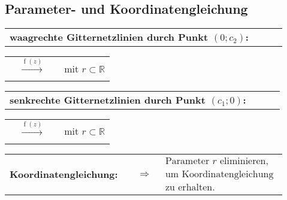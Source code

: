 \subsection{Parameter- und Koordinatengleichung}
	\begin{minipage}[t]{0.2\textwidth}
		
	\end{minipage}
	\begin{minipage}[t]{0.8\textwidth}
		\begin{tabular}{llll}
			\textbf{waagrechte Gitternetzlinien durch Punkt $(0; c_2)$:} & &\\[3pt]
		\end{tabular}
		\begin{tabular}{llll}
			\fbox{$z = \operatorname{z}\left( r \right) = r + \mathrm{j} c_2$} & $\xrightarrow[]{\operatorname{f}\left( z \right)}$ & \fbox{$w = \operatorname{w}\left( r \right) = \operatorname{f}\left( \operatorname{z}\left( r \right) \right) = \operatorname{f}\left( r + \mathrm{j} c_2 \right)$} & mit $r \subset \mathbb{R}$\\[3pt]
		\end{tabular}
		\begin{tabular}{llll}
			\textbf{senkrechte Gitternetzlinien durch Punkt $(c_1; 0)$:} & & &\\[3pt]
		\end{tabular}
		\begin{tabular}{llll}
			\fbox{$z = \operatorname{z}\left( r \right) = c_1 + \mathrm{j} r$} & $\xrightarrow[]{\operatorname{f}\left( z \right)}$ & \fbox{$w = \operatorname{w}\left( r \right) = \operatorname{f}\left( \operatorname{z}\left( r \right) \right) = \operatorname{f}\left( c_1 + \mathrm{j} r \right)$} & mit $r \subset \mathbb{R}$\\[3pt]
		\end{tabular}
		\begin{tabular}{llll}
			\textbf{Koordinatengleichung:} & 
			\fbox{$\left| \begin{array}{c}
				w_1 = \operatorname{Re}\left(\left[ \operatorname{f}\left(\operatorname{z}\left(r \right)\right)\right]\right)\\[3pt]
				w_2 = \operatorname{Re}\left(\left[ \operatorname{f}\left(\operatorname{z}\left(r \right)\right)\right]\right)
				\end{array} \right|$} &
			$\Rightarrow$ & 
			$\begin{array}{l}
				\text{Parameter $r$ eliminieren,}\\[3pt]
				\text{um Koordinatengleichung}\\[3pt]
				\text{zu erhalten.}
			\end{array}$
		\end{tabular}
	\end{minipage}

